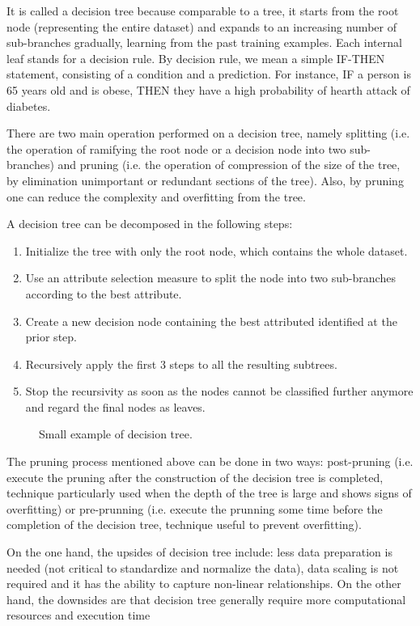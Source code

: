 It is called a decision tree because comparable to a tree, it starts from the root node (representing the entire dataset) and expands to an increasing number of sub-branches gradually, learning from the past training examples. Each internal leaf stands for a decision rule. By decision rule, we mean a simple IF-THEN statement, consisting of a condition and a prediction. For instance, IF a person is 65 years old and is obese, THEN they have a high probability of hearth attack of diabetes.

There are two main operation performed on a decision tree, namely splitting (i.e. the operation of ramifying the root node or a decision node into two sub-branches) and pruning (i.e. the operation of compression of the size of the tree, by elimination unimportant or redundant sections of the tree). Also, by pruning one can reduce the complexity and overfitting from the tree.

A decision tree can be decomposed in the following steps:
\begin{enumerate}
  \item Initialize the tree with only the root node, which contains the whole dataset.
  \item Use an attribute selection measure to split the node into two sub-branches according to the best attribute.
  \item Create a new decision node containing the best attributed identified at the prior step.
  \item Recursively apply the first 3 steps to all the resulting subtrees.
  \item Stop the recursivity as soon as the nodes cannot be classified further anymore and regard the final nodes as leaves.
\end{enumerate}

\begin{figure}[H]
  \centering
  \caption{Small example of decision tree.}
\end{figure}

The pruning process mentioned above can be done in two ways: post-pruning (i.e. execute the pruning after the construction of the decision tree is completed, technique particularly used when the depth of the tree is large and shows signs of overfitting) or pre-prunning (i.e. execute the prunning some time before the completion of the decision tree, technique useful to prevent overfitting).

On the one hand, the upsides of decision tree include: less data preparation is needed (not critical to standardize and normalize the data), data scaling is not required and it has the ability to capture non-linear relationships. On the other hand, the downsides are that decision tree generally require more computational resources and execution time

